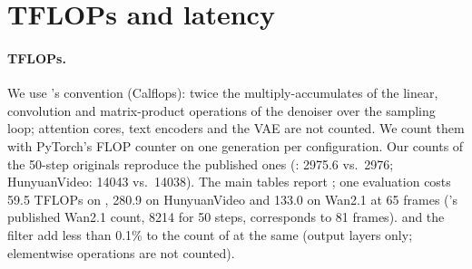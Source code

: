 \section{TFLOPs and latency}
\label{supp:cost}
\paragraph{TFLOPs.} We use \seacache's convention (Calflops): twice the multiply-accumulates of the linear, convolution
and matrix-product operations of the denoiser over the sampling loop; attention cores, text encoders and the VAE are not
counted. We count them with PyTorch's FLOP counter on one generation per configuration. Our counts of the 50-step
originals reproduce the published ones (\flux: 2975.6 vs.\ 2976; HunyuanVideo: 14043 vs.\ 14038). The main tables
report \nfe; one evaluation costs 59.5 TFLOPs on \flux, 280.9 on HunyuanVideo and 133.0 on Wan2.1 at 65 frames
(\seacache's published Wan2.1 count, 8214 for 50 steps, corresponds to 81 frames). \pcgs and the filter add less than 0.1\% to the
count of \seacache at the same \nfe (output layers only; elementwise operations are not counted).

